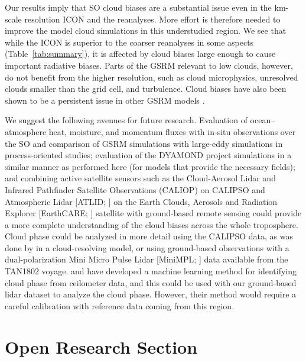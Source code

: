 \documentclass[draft]{agujournal2019}
\begin{document}
Our results imply that SO cloud biases are a substantial issue even in the km-scale resolution ICON and the reanalyses. More effort is therefore needed to improve the model cloud simulations in this understudied region. We see that while the ICON is superior to the coarser reanalyses in some aspects (Table~\ref{tab:summary}), it is affected by cloud biases large enough to cause important radiative biases. Parts of the GSRM relevant to low clouds, however, do not benefit from the higher resolution, such as cloud microphysics, unresolved clouds smaller than the grid cell, and turbulence. Cloud biases have also been shown to be a persistent issue in other GSRM models \cite{seiki2022}.

We suggest the following avenues for future research. Evaluation of ocean--atmosphere heat, moisture, and momentum fluxes with in-situ observations over the SO and comparison of GSRM simulations with large-eddy simulations in process-oriented studies; evaluation of the DYAMOND project simulations in a similar manner as performed here (for models that provide the necessary fields); and combining active satellite sensors such as the Cloud-Aerosol Lidar and Infrared Pathfinder Satellite Observations (CALIOP) on CALIPSO and Atmospheric Lidar [ATLID; ] on the Earth Clouds, Aerosols and Radiation Explorer [EarthCARE; ] satellite with ground-based remote sensing could provide a more complete understanding of the cloud biases across the whole troposphere. Cloud phase could be analyzed in more detail using the CALIPSO data, as was done by  in a cloud-resolving model, or using ground-based observations with a dual-polarization Mini Micro Pulse Lidar [MiniMPL; ] data available from the TAN1802 voyage.  and  have developed a machine learning method for identifying cloud phase from ceilometer data, and this could be used with our ground-based lidar dataset to analyze the cloud phase. However, their method would require a careful calibration with reference data coming from this region.

\section*{Open Research Section}
\end{document}
